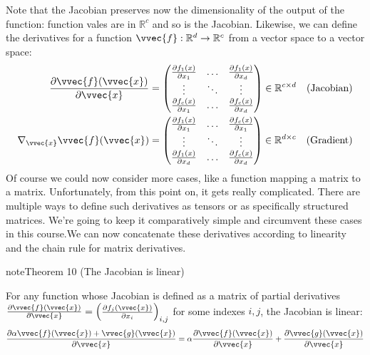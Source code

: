 \documentclass[letterpaper,10pt,english]{jupyterBook}
\begin{document}
\sphinxAtStartPar
Note that the Jacobian preserves now the dimensionality of the output of the function: function vales are in \(\mathbb{R}^c\) and so is the Jacobian. Likewise, we can define the derivatives for a function \(\vvec{f}:\mathbb{R}^d\rightarrow \mathbb{R}^{c}\) from a vector space to a vector space:
\begin{align*}
    \frac{\partial \vvec{f}(\vvec{x})}{\partial \vvec{x}} &=
    \begin{pmatrix}
    \frac{\partial f_1(x)}{\partial x_1}& \ldots &  \frac{\partial f_1(x)}{\partial x_d}\\ 
    \vdots & \ddots & \vdots \\ 
    \frac{\partial f_c(x)}{\partial x_1} &\ldots & \frac{\partial f_c(x)}{\partial x_d}
    \end{pmatrix} \in\mathbb{R}^{c\times d} & \text{(Jacobian)}\\
    \nabla_\vvec{x}\vvec{f}(\vvec{x}) &=
    \begin{pmatrix}
    \frac{\partial f_1(x)}{\partial x_1}& \ldots &  \frac{\partial f_c(x)}{\partial x_1}\\ 
    \vdots & \ddots & \vdots \\ 
    \frac{\partial f_1(x)}{\partial x_d} &\ldots & \frac{\partial f_c(x)}{\partial x_d}
    \end{pmatrix} \in\mathbb{R}^{d\times c} &\text{(Gradient)}
\end{align*}
\sphinxAtStartPar
Of course we could now consider more cases, like a function mapping a matrix to a matrix. Unfortunately, from this point on, it gets really complicated. There are multiple ways to define such derivatives \sphinxhyphen{} as tensors or as specifically structured matrices. We’re going to keep it comparatively simple and circumvent these cases in this course.We can now concatenate these derivatives according to linearity and the chain rule for matrix derivatives.
\label{optimization_gradients:theorem-0}
\begin{sphinxadmonition}{note}{Theorem 10 (The Jacobian is linear)}



\sphinxAtStartPar
For any function whose Jacobian is defined as a matrix of partial derivatives \(\frac{\partial \vvec{f}(\vvec{x})}{\partial \vvec{x}} = \begin{pmatrix}\frac{\partial f_j(\vvec{x})}{\partial x_i}\end{pmatrix}_{i,j}\) for some indexes \(i,j\), the Jacobian is linear:
\begin{equation*}
\begin{split}\frac{\partial\alpha\vvec{f}(\vvec{x})+\vvec{g}(\vvec{x})}{\partial\vvec{x}}
        =\alpha\frac{\partial\vvec{f}(\vvec{x})}{\partial\vvec{x}}+\frac{\partial\vvec{g}(\vvec{x})}{\partial\vvec{x}}\end{split}
\end{equation*}
\end{sphinxadmonition}
\end{document}

